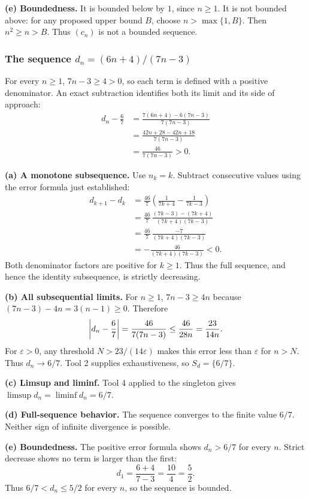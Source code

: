 \textbf{(e) Boundedness.}
It is bounded below by $1$, since $n\geq1$.
It is not bounded above: for any proposed upper bound $B$,
choose $n>\max\{1,B\}$. Then $n^2\geq n>B$.
Thus $(c_n)$ is not a bounded sequence.

\subsubsection*{The sequence $d_n=(6n+4)/(7n-3)$}

For every $n\geq1$, $7n-3\geq4>0$, so each term is
defined with a positive denominator. An exact subtraction
identifies both its limit and its side of approach:
\begin{align*}
 d_n-\frac67
 &=\frac{7(6n+4)-6(7n-3)}{7(7n-3)}\\
 &=\frac{42n+28-42n+18}{7(7n-3)}\\
 &=\frac{46}{7(7n-3)}>0.
\end{align*}

\textbf{(a) A monotone subsequence.}
Use $n_k=k$. Subtract consecutive values using the error
formula just established:
\begin{align*}
 d_{k+1}-d_k
 &=\frac{46}{7}\left(\frac1{7k+4}-\frac1{7k-3}\right)\\
 &=\frac{46}{7}\,
    \frac{(7k-3)-(7k+4)}{(7k+4)(7k-3)}\\
 &=\frac{46}{7}\,\frac{-7}{(7k+4)(7k-3)}\\
 &=-\frac{46}{(7k+4)(7k-3)}<0.
\end{align*}
Both denominator factors are positive for $k\geq1$.
Thus the full sequence, and hence the identity subsequence,
is strictly decreasing.

\textbf{(b) All subsequential limits.}
For $n\geq1$,
$7n-3\geq4n$ because $(7n-3)-4n=3(n-1)\geq0$.
Therefore
\[
 \left|d_n-\frac67\right|
 =\frac{46}{7(7n-3)}
 \leq\frac{46}{28n}
 =\frac{23}{14n}.
\]
For $\varepsilon>0$, any threshold
$N>23/(14\varepsilon)$ makes this error less than
$\varepsilon$ for $n>N$. Thus $d_n\to6/7$.
Tool 2 supplies exhaustiveness, so $S_d=\{6/7\}$.

\textbf{(c) Limsup and liminf.}
Tool 4 applied to the singleton gives
$\limsup d_n=\liminf d_n=6/7$.

\textbf{(d) Full-sequence behavior.}
The sequence converges to the finite value $6/7$.
Neither sign of infinite divergence is possible.

\textbf{(e) Boundedness.}
The positive error formula shows $d_n>6/7$ for every $n$.
Strict decrease shows no term is larger than the first:
\[
 d_1=\frac{6+4}{7-3}=\frac{10}{4}=\frac52.
\]
Thus $6/7<d_n\leq5/2$ for every $n$, so the sequence is bounded.

